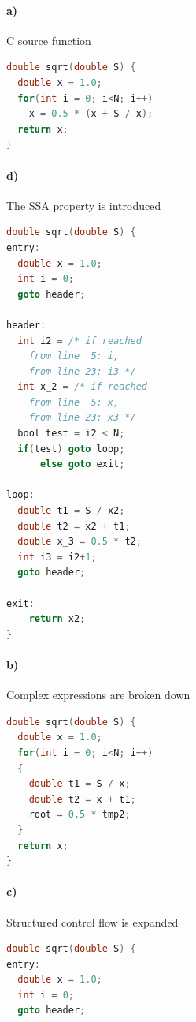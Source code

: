 \begin{figure}[p]
    \begin{minipage}{0.48\textwidth}
    \paragraph*{a)} C source function
    \begin{lstlisting}[language=C]
double sqrt(double S) {
  double x = 1.0;
  for(int i = 0; i<N; i++)
    x = 0.5 * (x + S / x);
  return x;
}
    \end{lstlisting}

    \vspace{1em}
    \paragraph*{d)} The SSA property is introduced
    \begin{lstlisting}[language=C]
double sqrt(double S) {
entry:
  double x = 1.0;
  int i = 0;
  goto header;

header:
  int i2 = /* if reached
    from line  5: i,
    from line 23: i3 */
  int x_2 = /* if reached
    from line  5: x,
    from line 23: x3 */
  bool test = i2 < N;
  if(test) goto loop;
      else goto exit;

loop:
  double t1 = S / x2;
  double t2 = x2 + t1;
  double x_3 = 0.5 * t2;
  int i3 = i2+1;
  goto header;

exit:
    return x2;
}
    \end{lstlisting}
    \end{minipage}
    \hfill
    \begin{minipage}{0.48\textwidth}
    \paragraph*{b)} Complex expressions are broken down
    \begin{lstlisting}[language=C,basicstyle=\linespread{1.06451612903}\ttfamily]
double sqrt(double S) {
  double x = 1.0;
  for(int i = 0; i<N; i++)
  {
    double t1 = S / x;
    double t2 = x + t1;
    root = 0.5 * tmp2;
  }
  return x;
}
    \end{lstlisting}

    \vspace{1em}
    \paragraph*{c)} Structured control flow is expanded
    \begin{lstlisting}[language=C,basicstyle=\linespread{1.06451612903}\ttfamily]
double sqrt(double S) {
entry:
  double x = 1.0;
  int i = 0;
  goto header;


\end{lstlisting}
\end{minipage}
\end{figure}
